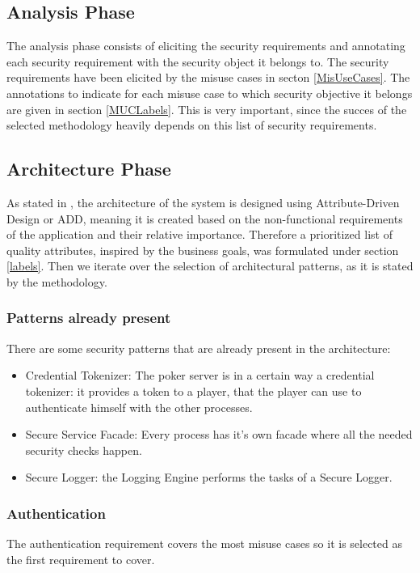 \documentclass[a4paper,11pt]{report}
\begin{document}
\subsection{Analysis Phase}
The analysis phase consists of eliciting the security requirements and annotating each
security requirement with the security object it belongs to. The security requirements have been elicited by the misuse cases
in secton \ref{MisUseCases}. The annotations to indicate for each misuse case to which security objective it belongs
are given in section \ref{MUCLabels}. This is very important, since the succes of the selected methodology heavily depends
on this list of security requirements.


\subsection{Architecture Phase}
As stated in \cite[p13]{yskout}, the architecture of the system is designed using Attribute-Driven Design or ADD,
meaning it is created based on the non-functional requirements of the application and their relative importance.
Therefore a prioritized list of quality attributes, inspired by the business goals, was formulated under
section \ref{labels}. Then we iterate over the selection of architectural patterns, as it is stated by the methodology.

\subsubsection{Patterns already present}
There are some security patterns that are already present in the architecture:
\begin{itemize}
\item Credential Tokenizer: The poker server is in a certain way a credential tokenizer: it provides a token to a
player, that the player can use to authenticate himself with the other processes.
\item Secure Service Facade: Every process has it's own facade where all the needed
security checks happen.
\item Secure Logger: the Logging Engine performs the tasks of a Secure Logger.
\end{itemize}

\subsubsection{Authentication}
\label{ArchitectureAuthentication}
The authentication requirement covers the most misuse cases so it is selected as the first requirement to cover.
\end{document}
